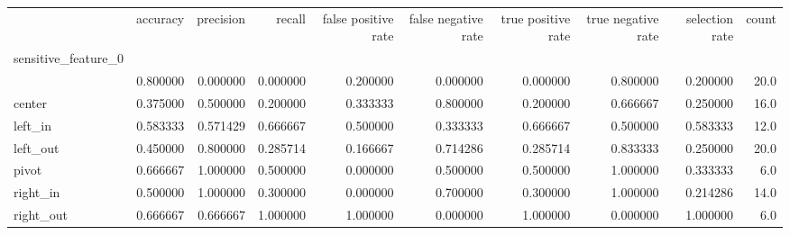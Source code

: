 \begin{tabular}{lrrrrrrrrr}
\toprule
{} &  accuracy &  precision &    recall &  false positive rate &  false negative rate &  true positive rate &  true negative rate &  selection rate &  count \\
sensitive\_feature\_0 &           &            &           &                      &                      &                     &                     &                 &        \\
\midrule
                    &  0.800000 &   0.000000 &  0.000000 &             0.200000 &             0.000000 &            0.000000 &            0.800000 &        0.200000 &   20.0 \\
center              &  0.375000 &   0.500000 &  0.200000 &             0.333333 &             0.800000 &            0.200000 &            0.666667 &        0.250000 &   16.0 \\
left\_in             &  0.583333 &   0.571429 &  0.666667 &             0.500000 &             0.333333 &            0.666667 &            0.500000 &        0.583333 &   12.0 \\
left\_out            &  0.450000 &   0.800000 &  0.285714 &             0.166667 &             0.714286 &            0.285714 &            0.833333 &        0.250000 &   20.0 \\
pivot               &  0.666667 &   1.000000 &  0.500000 &             0.000000 &             0.500000 &            0.500000 &            1.000000 &        0.333333 &    6.0 \\
right\_in            &  0.500000 &   1.000000 &  0.300000 &             0.000000 &             0.700000 &            0.300000 &            1.000000 &        0.214286 &   14.0 \\
right\_out           &  0.666667 &   0.666667 &  1.000000 &             1.000000 &             0.000000 &            1.000000 &            0.000000 &        1.000000 &    6.0 \\
\bottomrule
\end{tabular}
